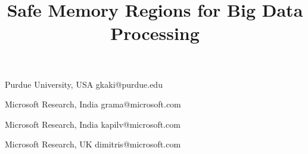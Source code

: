 \documentclass[preprint,numbers,10pt]{sigplanconf}
\begin{document}




\title{Safe Memory Regions for Big Data Processing}

           {Purdue University, USA}
           {gkaki@purdue.edu}

           {Microsoft Research, India}
           {grama@microsoft.com}

           {Microsoft Research, India}
           {kapilv@microsoft.com}

           {Microsoft Research, UK}
           {dimitris@microsoft.com}


\maketitle

\begin{abstract}

\end{abstract}





















\onecolumn
\appendix

\end{document}
